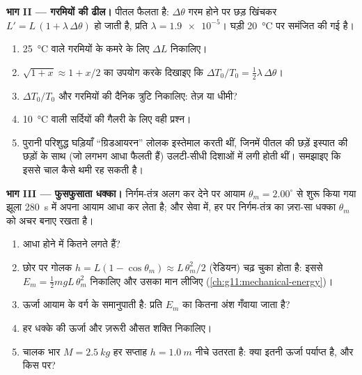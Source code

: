 \begin{problem}
\medskip
\noindent\textbf{भाग II --- गरमियों की ढील।} पीतल फैलता है: $\Delta\theta$ गरम होने
पर छड़ खिंचकर $L' = L\,(1 + \lambda\,
\Delta\theta)$ हो जाती है, प्रति  $\lambda = \num{1.9e-5}$। घड़ी \qty{20}{\celsius}
पर समंजित की गई है।
\begin{enumerate}[resume]
  \item \qty{25}{\celsius} वाले गरमियों के कमरे के लिए $\Delta L$ निकालिए।
  \item $\sqrt{1+x} \approx 1 + x/2$ का उपयोग करके दिखाइए कि $\Delta T_0 / T_0 = \tfrac12 \lambda\, \Delta\theta$।
  \item $\Delta T_0/T_0$ और गरमियों की दैनिक त्रुटि निकालिए: तेज़ या धीमी?
  \item \qty{10}{\celsius} वाली सर्दियों की गैलरी के लिए वही प्रश्न।
  \item पुरानी परिशुद्ध घड़ियाँ ``ग्रिडआयरन'' लोलक इस्तेमाल करती थीं, जिनमें
        पीतल की छड़ें इस्पात की छड़ों के साथ (जो लगभग आधा फैलती हैं) उलटी-सीधी
        दिशाओं में लगी होती थीं। समझाइए कि इससे चाल कैसे थमी रह सकती है।
\end{enumerate}

\medskip
\noindent\textbf{भाग III --- फुसफुसाता धक्का।} निर्गम-तंत्र अलग कर देने पर
आयाम $\theta_m = 2.00^\circ$ से शुरू किया गया झूला \qty{280}{s} में अपना आयाम
आधा कर लेता है; और सेवा में, हर  पर निर्गम-तंत्र का ज़रा-सा
धक्का $\theta_m$ को अचर बनाए रखता है।
\begin{enumerate}[resume]
  \item आधा होने में कितने  लगते हैं?
  \item छोर पर गोलक $h = L(1 - \cos\theta_m)
        \approx L\,\theta_m^2/2$ (रेडियन) चढ़ चुका होता है: इससे $E_m = \tfrac12
        m g L\,\theta_m^2$ निकालिए
        और उसका मान लीजिए (\cref{ch:g11:mechanical-energy})।
  \item ऊर्जा आयाम के वर्ग के समानुपाती है: प्रति
         $E_m$ का कितना अंश गँवाया जाता है?
  \item हर धक्के की ऊर्जा और ज़रूरी औसत शक्ति निकालिए।
  \item चालक भार $M = \qty{2.5}{kg}$ हर सप्ताह $h =
        \qty{1.0}{m}$ नीचे उतरता है: क्या
        इतनी ऊर्जा पर्याप्त है, और किस  पर?
\end{enumerate}


\end{problem}
